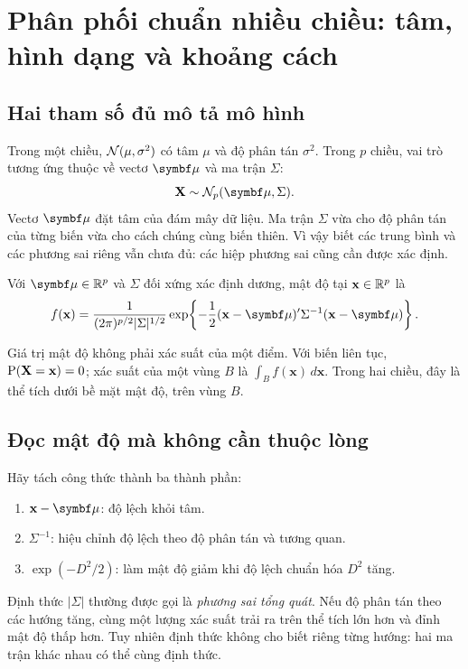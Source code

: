 \clearpage
\section{Phân phối chuẩn nhiều chiều: tâm, hình dạng và khoảng cách}
\label{sec:normal}

\subsection{Hai tham số đủ mô tả mô hình}
Trong một chiều, $\mathcal N(\mu,\sigma^2)$ có tâm $\mu$ và độ phân tán
$\sigma^2$. Trong $p$ chiều, vai trò tương ứng thuộc về vectơ $\vmu$ và
ma trận $\Sigma$:
\[
 \mathbf X\sim\N_p(\vmu,\Sigma).
\]
Vectơ $\vmu$ đặt tâm của đám mây dữ liệu. Ma trận $\Sigma$ vừa cho độ phân
tán của từng biến vừa cho cách chúng cùng biến thiên. Vì vậy biết các trung
bình và các phương sai riêng vẫn chưa đủ: các hiệp phương sai cũng cần được xác định.

\begin{definition}
Với $\vmu\in\R^p$ và $\Sigma$ đối xứng xác định dương, mật độ tại
$\mathbf x\in\mathbb R^p$ là
\begin{equation}
 f(\mathbf x)=\frac{1}{(2\pi)^{p/2}|\Sigma|^{1/2}}
 \exp\!\left\{-\frac12(\mathbf x-\vmu)'\Sigma^{-1}
 (\mathbf x-\vmu)\right\}.
 \label{eq:density}
\end{equation}
\end{definition}


Giá trị mật độ không phải xác suất của một điểm. Với biến liên tục,
$\operatorname{P}(\mathbf X=\mathbf x)=0$; xác suất của một vùng $B$ là
$\int_B f(\mathbf x)\,d\mathbf x$. Trong hai chiều, đây là thể tích dưới
bề mặt mật độ, trên vùng $B$.

\subsection{Đọc mật độ mà không cần thuộc lòng}
Hãy tách công thức thành ba thành phần:
\begin{enumerate}
 \item $\mathbf x-\vmu$: độ lệch khỏi tâm.
 \item $\Sigma^{-1}$: hiệu chỉnh độ lệch theo độ phân tán và tương quan.
 \item $\exp(-D^2/2)$: làm mật độ giảm khi độ lệch chuẩn hóa $D^2$ tăng.
\end{enumerate}
Định thức $|\Sigma|$ thường được gọi là \emph{phương sai tổng quát}.
Nếu độ phân tán theo các hướng tăng, cùng một lượng xác suất trải ra trên
thể tích lớn hơn và đỉnh mật độ thấp hơn. Tuy nhiên định thức không cho biết
riêng từng hướng: hai ma trận khác nhau có thể cùng định thức.

